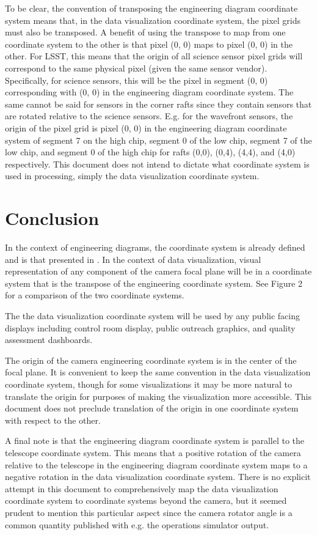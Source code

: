 To be clear, the convention of transposing the engineering diagram coordinate system means that, in the data visualization coordinate system, the pixel grids must also be transposed.  A benefit of using the transpose to map from one coordinate system to the other is that pixel (0, 0) maps to pixel (0, 0) in the other.  For LSST, this means that the origin of all science sensor pixel grids will correspond to the same physical pixel (given the same sensor vendor).  Specifically, for science sensors, this will be the pixel in segment (0, 0) corresponding with (0, 0) in the engineering diagram coordinate system.  The same cannot be said for sensors in the corner rafts since they contain sensors that are rotated relative to the science sensors.  E.g. for the wavefront sensors, the origin of the pixel grid is pixel (0, 0) in the engineering diagram coordinate system of segment 7 on the high chip, segment 0 of the low chip, segment 7 of the low chip, and segment 0 of the high chip for rafts (0,0), (0,4), (4,4), and (4,0) respectively.  This document does not intend to dictate what coordinate system is used in processing, simply the data visualization coordinate system.

\section{Conclusion}
In the context of engineering diagrams, the coordinate system is already defined and is that presented in . In the context of data visualization, visual representation of any component of the camera focal plane will be in a coordinate system that is the transpose of the engineering coordinate system.  See Figure 2 for a comparison of the two coordinate systems.

The the data visualization coordinate system will be used by any public facing displays including control room display, public outreach graphics, and quality assessment dashboards.

The origin of the camera engineering coordinate system is in the center of the focal plane. It is convenient to keep the same convention in the data visualization coordinate system, though for some visualizations it may be more natural to translate the origin for purposes of making the visualization more accessible. This document does not preclude translation of the origin in one coordinate system with respect to the other.

A final note is that the engineering diagram coordinate system is parallel to the telescope coordinate system.  This means that a positive rotation of the camera relative to the telescope in the engineering diagram coordinate system maps to a negative rotation in the data visualization coordinate system.  There is no explicit attempt in this document to comprehensively map the data visualization coordinate system to coordinate systems beyond the camera, but it seemed prudent to mention this particular aspect since the camera rotator angle is a common quantity published with e.g. the operations simulator output.

